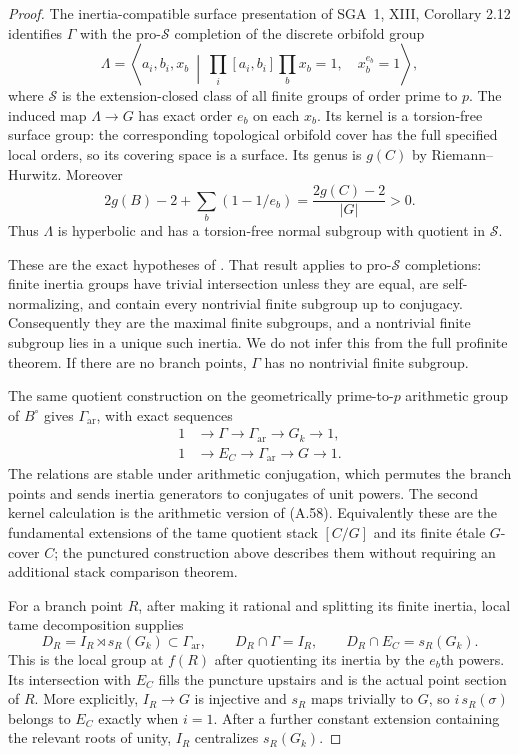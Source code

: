 \begin{proof}
The inertia-compatible surface presentation of
SGA~1, XIII, Corollary 2.12 \citep{A_SGA1} identifies
$\Gamma$ with the pro-$\mathscr S$ completion of
the discrete orbifold group
\[
 \Lambda=\left\langle a_i,b_i,x_b\ \middle|\
   \prod_i[a_i,b_i]\prod_bx_b=1,\quad x_b^{e_b}=1
                         \right\rangle,
\]
where $\mathscr S$ is the extension-closed class of
all finite groups of order prime to $p$.
The induced map $\Lambda\to G$ has exact order
$e_b$ on each $x_b$. Its kernel is a torsion-free
surface group: the corresponding topological
orbifold cover has the full specified local orders,
so its covering space is a surface. Its genus is
$g(C)$ by Riemann--Hurwitz. Moreover
\[
 2g(B)-2+\sum_b(1-1/e_b)
       =\frac{2g(C)-2}{|G|}>0.
\]
Thus $\Lambda$ is hyperbolic and has a torsion-free
normal subgroup with quotient in $\mathscr S$.

These are the exact hypotheses of
\citet[Lemma 3.1, author version pp.~7--8]
{A_BoggiZalesskii2019}. That result applies to
pro-$\mathscr S$ completions: finite inertia groups
have trivial intersection unless they are equal,
are self-normalizing, and contain every nontrivial
finite subgroup up to conjugacy. Consequently they
are the maximal finite subgroups, and a nontrivial
finite subgroup lies in a unique such inertia.
We do not infer this from the full profinite theorem.
If there are no branch points, $\Gamma$ has no
nontrivial finite subgroup.

The same quotient construction on the geometrically
prime-to-$p$ arithmetic group of $B^\circ$ gives
$\Gamma_{\mathrm{ar}}$, with exact sequences
\[
\begin{aligned}
 1&\longrightarrow\Gamma\longrightarrow\Gamma_{\mathrm{ar}}
                  \longrightarrow G_k\longrightarrow1,\\
 1&\longrightarrow E_C\longrightarrow\Gamma_{\mathrm{ar}}
                  \longrightarrow G\longrightarrow1.
\end{aligned}                                          \tag{A.59}
\]
The relations are stable under arithmetic conjugation,
which permutes the branch points and sends inertia
generators to conjugates of unit powers. The second
kernel calculation is the arithmetic version of
\textup{(A.58)}. Equivalently these are the fundamental
extensions of the tame quotient stack $[C/G]$ and
its finite \'etale $G$-cover $C$; the punctured
construction above describes them without requiring
an additional stack comparison theorem.

For a branch point $R$, after making it rational
and splitting its finite inertia, local tame
decomposition supplies
\[
 D_R=I_R\rtimes s_R(G_k)\subset\Gamma_{\mathrm{ar}},
 \qquad D_R\cap\Gamma=I_R,
 \qquad D_R\cap E_C=s_R(G_k).                           \tag{A.60}
\]
This is the local group at $f(R)$ after quotienting
its inertia by the $e_b$th powers. Its intersection
with $E_C$ fills the puncture upstairs and is the
actual point section of $R$. More explicitly,
$I_R\to G$ is injective and $s_R$ maps trivially to
$G$, so $i\,s_R(\sigma)$ belongs to $E_C$ exactly
when $i=1$. After a further constant extension
containing the relevant roots of unity, $I_R$
centralizes $s_R(G_k)$.


\end{proof}
